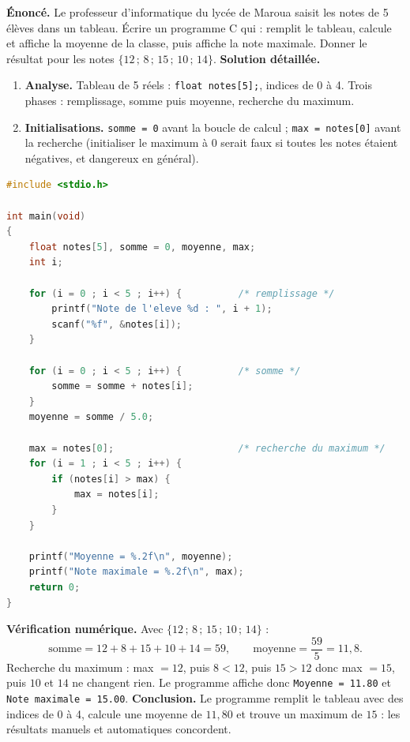 \documentclass[11pt]{article}
\begin{document}
\begin{exoresolu}
\textbf{Énoncé.} Le professeur d'informatique du lycée de Maroua saisit les notes de 5 élèves dans un tableau. Écrire un programme C qui : remplit le tableau, calcule et affiche la moyenne de la classe, puis affiche la note maximale. Donner le résultat pour les notes $\{12\,;\,8\,;\,15\,;\,10\,;\,14\}$.
\tcblower
\textbf{Solution détaillée.}
\begin{enumerate}
\item \textbf{Analyse.} Tableau de 5 réels : \texttt{float notes[5];}, indices de 0 à 4. Trois phases : remplissage, somme puis moyenne, recherche du maximum.
\item \textbf{Initialisations.} \texttt{somme = 0} avant la boucle de calcul ; \texttt{max = notes[0]} avant la recherche (initialiser le maximum à 0 serait faux si toutes les notes étaient négatives, et dangereux en général).
\end{enumerate}
\begin{lstlisting}[language=C]
#include <stdio.h>

int main(void)
{
    float notes[5], somme = 0, moyenne, max;
    int i;

    for (i = 0 ; i < 5 ; i++) {          /* remplissage */
        printf("Note de l'eleve %d : ", i + 1);
        scanf("%f", &notes[i]);
    }

    for (i = 0 ; i < 5 ; i++) {          /* somme */
        somme = somme + notes[i];
    }
    moyenne = somme / 5.0;

    max = notes[0];                      /* recherche du maximum */
    for (i = 1 ; i < 5 ; i++) {
        if (notes[i] > max) {
            max = notes[i];
        }
    }

    printf("Moyenne = %.2f\n", moyenne);
    printf("Note maximale = %.2f\n", max);
    return 0;
}
\end{lstlisting}
\textbf{Vérification numérique.} Avec $\{12\,;\,8\,;\,15\,;\,10\,;\,14\}$ :
\[ \text{somme} = 12 + 8 + 15 + 10 + 14 = 59, \qquad \text{moyenne} = \dfrac{59}{5} = 11{,}8. \]
Recherche du maximum : max $= 12$, puis $8 < 12$, puis $15 > 12$ donc max $= 15$, puis $10$ et $14$ ne changent rien. Le programme affiche donc \texttt{Moyenne = 11.80} et \texttt{Note maximale = 15.00}.
\textbf{Conclusion.} Le programme remplit le tableau avec des indices de 0 à 4, calcule une moyenne de $11{,}80$ et trouve un maximum de $15$ : les résultats manuels et automatiques concordent.
\end{exoresolu}
\end{document}
